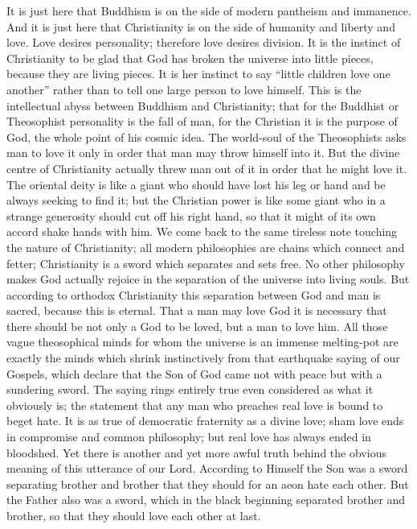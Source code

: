 It is just here that Buddhism is on the side of modern pantheism and immanence. And it is just here that Christianity is on the side of humanity and liberty and love. Love desires personality; therefore love desires division. It is the instinct of Christianity to be glad that God has broken the universe into little pieces, because they are living pieces. It is her instinct to say “little children love one another” rather than to tell one large person to love himself. This is the intellectual abyss between Buddhism and Christianity; that for the Buddhist or Theosophist personality is the fall of man, for the Christian it is the purpose of God, the whole point of his cosmic idea. The world-soul of the Theosophists asks man to love it only in order that man may throw himself into it. But the divine centre of Christianity actually threw man out of it in order that he might love it. The oriental deity is like a giant who should have lost his leg or hand and be always seeking to find it; but the Christian power is like some giant who in a strange generosity should cut off his right hand, so that it might of its own accord shake hands with him. We come back to the same tireless note touching the nature of Christianity; all modern philosophies are chains which connect and fetter; Christianity is a sword which separates and sets free. No other philosophy makes God actually rejoice in the separation of the universe into living souls. But according to orthodox Christianity this separation between God and man is sacred, because this is eternal. That a man may love God it is necessary that there should be not only a God to be loved, but a man to love him. All those vague theosophical minds for whom the universe is an immense melting-pot are exactly the minds which shrink instinctively from that earthquake saying of our Gospels, which declare that the Son of God came not with peace but with a sundering sword. The saying rings entirely true even considered as what it obviously is; the statement that any man who preaches real love is bound to beget hate. It is as true of democratic fraternity as a divine love; sham love ends in compromise and common philosophy; but real love has always ended in bloodshed. Yet there is another and yet more awful truth behind the obvious meaning of this utterance of our Lord. According to Himself the Son was a sword separating brother and brother that they should for an aeon hate each other. But the Father also was a sword, which in the black beginning separated brother and brother, so that they should love each other at last.

